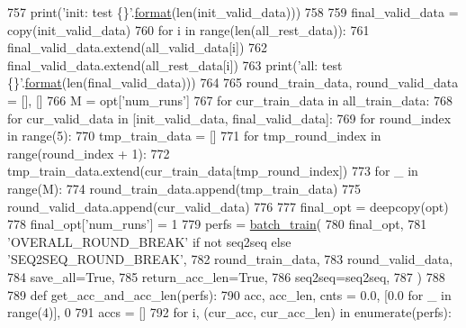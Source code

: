 \begin{DoxyCode}
757     print(\textcolor{stringliteral}{'init: test \{\}'}.\hyperlink{namespaceparlai_1_1chat__service_1_1services_1_1messenger_1_1shared__utils_a32e2e2022b824fbaf80c747160b52a76}{format}(len(init\_valid\_data)))
758 
759     final\_valid\_data = copy(init\_valid\_data)
760     \textcolor{keywordflow}{for} i \textcolor{keywordflow}{in} range(len(all\_rest\_data)):
761         final\_valid\_data.extend(all\_valid\_data[i])
762         final\_valid\_data.extend(all\_rest\_data[i])
763     print(\textcolor{stringliteral}{'all: test \{\}'}.\hyperlink{namespaceparlai_1_1chat__service_1_1services_1_1messenger_1_1shared__utils_a32e2e2022b824fbaf80c747160b52a76}{format}(len(final\_valid\_data)))
764 
765     round\_train\_data, round\_valid\_data = [], []
766     M = opt[\textcolor{stringliteral}{'num\_runs'}]
767     \textcolor{keywordflow}{for} cur\_train\_data \textcolor{keywordflow}{in} all\_train\_data:
768         \textcolor{keywordflow}{for} cur\_valid\_data \textcolor{keywordflow}{in} [init\_valid\_data, final\_valid\_data]:
769             \textcolor{keywordflow}{for} round\_index \textcolor{keywordflow}{in} range(5):
770                 tmp\_train\_data = []
771                 \textcolor{keywordflow}{for} tmp\_round\_index \textcolor{keywordflow}{in} range(round\_index + 1):
772                     tmp\_train\_data.extend(cur\_train\_data[tmp\_round\_index])
773                 \textcolor{keywordflow}{for} \_ \textcolor{keywordflow}{in} range(M):
774                     round\_train\_data.append(tmp\_train\_data)
775                     round\_valid\_data.append(cur\_valid\_data)
776 
777     final\_opt = deepcopy(opt)
778     final\_opt[\textcolor{stringliteral}{'num\_runs'}] = 1
779     perfs = \hyperlink{namespaceprojects_1_1mastering__the__dungeon_1_1mturk_1_1tasks_1_1MTD_1_1run_a1b5b55764d0ead5087efdcc429514c3e}{batch\_train}(
780         final\_opt,
781         \textcolor{stringliteral}{'OVERALL\_ROUND\_BREAK'} \textcolor{keywordflow}{if} \textcolor{keywordflow}{not} seq2seq \textcolor{keywordflow}{else} \textcolor{stringliteral}{'SEQ2SEQ\_ROUND\_BREAK'},
782         round\_train\_data,
783         round\_valid\_data,
784         save\_all=\textcolor{keyword}{True},
785         return\_acc\_len=\textcolor{keyword}{True},
786         seq2seq=seq2seq,
787     )
788 
789     \textcolor{keyword}{def }get\_acc\_and\_acc\_len(perfs):
790         acc, acc\_len, cnts = 0.0, [0.0 \textcolor{keywordflow}{for} \_ \textcolor{keywordflow}{in} range(4)], 0
791         accs = []
792         \textcolor{keywordflow}{for} i, (cur\_acc, cur\_acc\_len) \textcolor{keywordflow}{in} enumerate(perfs):

\end{DoxyCode}
